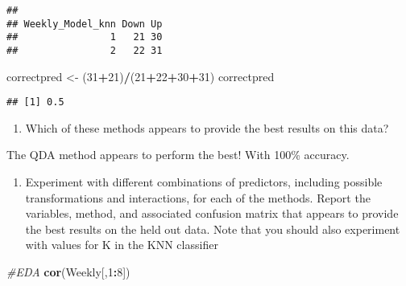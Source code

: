 \documentclass[]{article}
\newenvironment{Shaded}{\begin{snugshade}}{\end{snugshade}}
\newcommand{\KeywordTok}[1]{\textcolor[rgb]{0.13,0.29,0.53}{\textbf{#1}}}
\newcommand{\DecValTok}[1]{\textcolor[rgb]{0.00,0.00,0.81}{#1}}
\newcommand{\StringTok}[1]{\textcolor[rgb]{0.31,0.60,0.02}{#1}}
\newcommand{\CommentTok}[1]{\textcolor[rgb]{0.56,0.35,0.01}{\textit{#1}}}
\newcommand{\OperatorTok}[1]{\textcolor[rgb]{0.81,0.36,0.00}{\textbf{#1}}}
\newcommand{\NormalTok}[1]{#1}
\providecommand{\tightlist}{%
  \setlength{\itemsep}{0pt}\setlength{\parskip}{0pt}}
\begin{document}
\begin{verbatim}
##                 
## Weekly_Model_knn Down Up
##                1   21 30
##                2   22 31
\end{verbatim}

\begin{Shaded}
\begin{Highlighting}[]
\NormalTok{correctpred <-}\StringTok{ }\NormalTok{(}\DecValTok{31}\OperatorTok{+}\DecValTok{21}\NormalTok{)}\OperatorTok{/}\NormalTok{(}\DecValTok{21}\OperatorTok{+}\DecValTok{22}\OperatorTok{+}\DecValTok{30}\OperatorTok{+}\DecValTok{31}\NormalTok{)}
\NormalTok{correctpred}
\end{Highlighting}
\end{Shaded}

\begin{verbatim}
## [1] 0.5
\end{verbatim}

\begin{enumerate}
\def\labelenumi{(\alph{enumi})}
\setcounter{enumi}{7}
\tightlist
\item
  Which of these methods appears to provide the best results on this
  data?
\end{enumerate}

The QDA method appears to perform the best! With 100\% accuracy.

\begin{enumerate}
\def\labelenumi{(\roman{enumi})}
\tightlist
\item
  Experiment with different combinations of predictors, including
  possible transformations and interactions, for each of the methods.
  Report the variables, method, and associated confusion matrix that
  appears to provide the best results on the held out data. Note that
  you should also experiment with values for K in the KNN classifier
\end{enumerate}

\begin{Shaded}
\begin{Highlighting}[]
\CommentTok{#EDA}
\KeywordTok{cor}\NormalTok{(Weekly[,}\DecValTok{1}\OperatorTok{:}\DecValTok{8}\NormalTok{])}
\end{Highlighting}
\end{Shaded}
\end{document}
